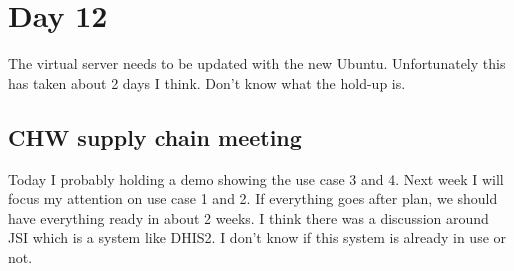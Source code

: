 \section{Day 12}
The virtual server needs to be updated with the new Ubuntu.
Unfortunately this has taken about 2 days I think.
Don't know what the hold-up is.
\subsection{CHW supply chain meeting}
Today I probably holding a demo showing the use case 3 and 4.
Next week I will focus my attention on use case 1 and 2. 
If everything goes after plan, we should have everything ready in about 2 weeks.
I think there was a discussion around JSI which is a system like DHIS2. 
I don't know if this system is already in use or not.
